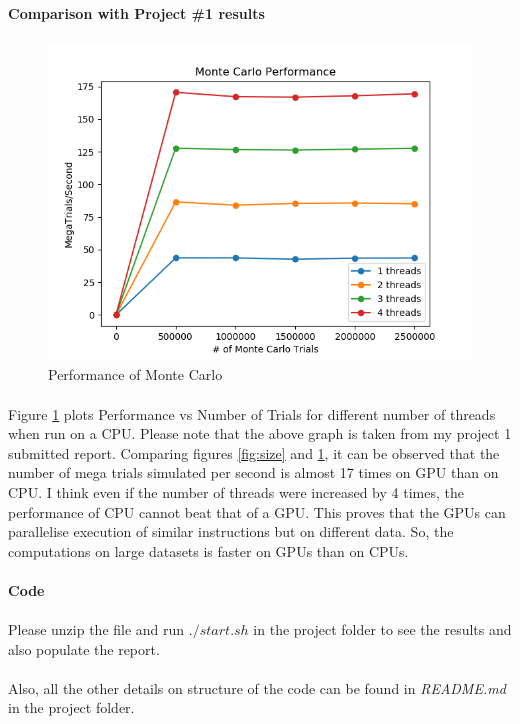 \documentclass[notitlepage]{report}
\begin{document}
	\paragraph{Comparison with Project \#1 results}
	\paragraph{}
	\begin{figure}[!ht]
		\includegraphics [width=\linewidth] {proj1.png}
		\caption{Performance of Monte Carlo}
		\label{fig:cpu}
	\end{figure}
	\paragraph{} Figure \ref{fig:cpu} plots Performance vs Number of Trials for different number of threads when run on a CPU. Please note that the above graph is taken from my project 1 submitted report. Comparing figures \ref{fig:size} and \ref{fig:cpu}, it can be observed that the number of mega trials simulated per second is almost 17 times on GPU than on CPU. I think even if the number of threads were increased by 4 times, the performance of CPU cannot beat that of a GPU. This proves that the GPUs can parallelise execution of similar instructions but on different data. So, the computations on large datasets is faster on GPUs than on CPUs.
	
	\paragraph{Code}
	\paragraph{} Please unzip the file and run $./start.sh$ in the project folder to see the results and also populate the report.
	\paragraph{} Also, all the other details on structure of the code can be found in \textit{README.md} in the project folder.
\end{document}
